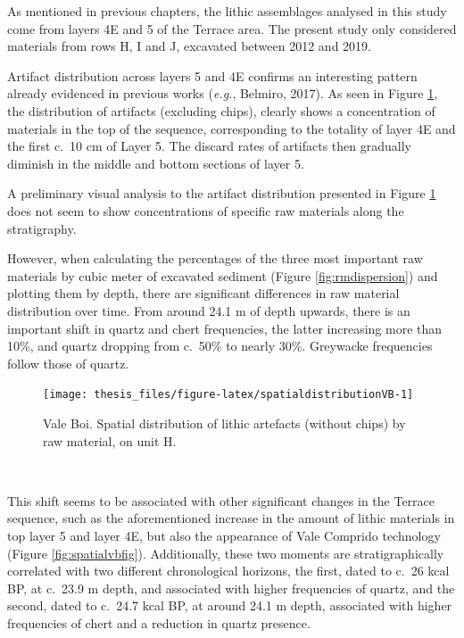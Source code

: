 \documentclass[12pt,twoside]{reedthesis}
\begin{document}
As mentioned in previous chapters, the lithic assemblages analysed in this study come from layers 4E and 5 of the Terrace area. The present study only considered materials from rows H, I and J, excavated between 2012 and 2019.

Artifact distribution across layers 5 and 4E confirms an interesting pattern already evidenced in previous works (\emph{e.g.}, Belmiro, 2017). As seen in Figure \ref{fig:spatialdistributionVB}, the distribution of artifacts (excluding chips), clearly shows a concentration of materials in the top of the sequence, corresponding to the totality of layer 4E and the first c.~10 cm of Layer 5. The discard rates of artifacts then gradually diminish in the middle and bottom sections of layer 5.

A preliminary visual analysis to the artifact distribution presented in Figure \ref{fig:spatialdistributionVB} does not seem to show concentrations of specific raw materials along the stratigraphy.

However, when calculating the percentages of the three most important raw materials by cubic meter of excavated sediment (Figure \ref{fig:rmdispersion}) and plotting them by depth, there are significant differences in raw material distribution over time. From around 24.1 m of depth upwards, there is an important shift in quartz and chert frequencies, the latter increasing more than 10\%, and quartz dropping from c.~50\% to nearly 30\%. Greywacke frequencies follow those of quartz.
\begin{figure}

{\centering \texttt{[image: thesis\_files/figure-latex/spatialdistributionVB-1]} 

}

\caption{Vale Boi. Spatial distribution of lithic artefacts (without chips) by raw material, on unit H.}\label{fig:spatialdistributionVB}
\end{figure}
~

This shift seems to be associated with other significant changes in the Terrace sequence, such as the aforementioned increase in the amount of lithic materials in top layer 5 and layer 4E, but also the appearance of Vale Comprido technology (Figure \ref{fig:spatialvbfig}). Additionally, these two moments are stratigraphically correlated with two different chronological horizons, the first, dated to c.~26 kcal BP, at c.~23.9 m depth, and associated with higher frequencies of quartz, and the second, dated to c.~24.7 kcal BP, at around 24.1 m depth, associated with higher frequencies of chert and a reduction in quartz presence.
\end{document}
